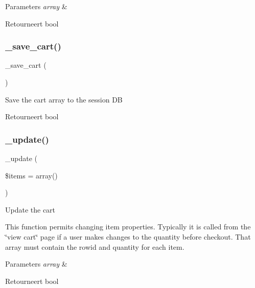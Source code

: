 \begin{DoxyParams}{Parameters}
{\em array} & \\
\hline
\end{DoxyParams}
\begin{DoxyReturn}{Retourneert}
bool 
\end{DoxyReturn}
\mbox{\label{class_c_i___cart_abaa559f3e9e7f8ad933f19165fb61083}} 
\subsubsection{\texorpdfstring{\_save\_cart()}{\_save\_cart()}}
{\footnotesize\ttfamily \+\_\+save\+\_\+cart (\begin{DoxyParamCaption}{ }\end{DoxyParamCaption})\hspace{0.3cm}{\ttfamily [protected]}}

Save the cart array to the session DB

\begin{DoxyReturn}{Retourneert}
bool 
\end{DoxyReturn}
\mbox{\label{class_c_i___cart_ac7b19afff2357d4b9e926ee2df1f3e65}} 
\subsubsection{\texorpdfstring{\_update()}{\_update()}}
{\footnotesize\ttfamily \+\_\+update (\begin{DoxyParamCaption}\item[{}]{\$items = {\ttfamily array()} }\end{DoxyParamCaption})\hspace{0.3cm}{\ttfamily [protected]}}

Update the cart

This function permits changing item properties. Typically it is called from the \char`\"{}view cart\char`\"{} page if a user makes changes to the quantity before checkout. That array must contain the rowid and quantity for each item.


\begin{DoxyParams}{Parameters}
{\em array} & \\
\hline
\end{DoxyParams}
\begin{DoxyReturn}{Retourneert}
bool 
\end{DoxyReturn}
\mbox{\label{class_c_i___cart_a9d7b86f0ac41c6301e6373644011d87f}} 
